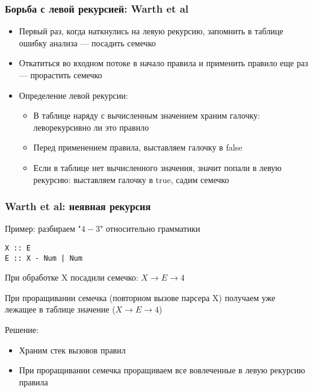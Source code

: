 \documentclass{beamer}
\begin{document}
\begin{frame}[fragile]
  \transwipe[direction=90]
  \frametitle{Борьба с левой рекурсией: Warth et al}
\begin{itemize}
  \item Первый раз, когда наткнулись на левую рекурсию, запомнить в таблице 
ошибку анализа --- посадить семечко
  \item Откатиться во входном потоке в начало правила и применить правило еще раз --- прорастить семечко
\end{itemize}

\begin{itemize}
  \item Определение левой рекурсии:
  \begin{itemize}
    \item В таблице наряду с вычисленным значением храним галочку: 
леворекурсивно ли это правило
    \item Перед применением правила, выставляем галочку в false
    \item Если в таблице нет вычисленного значения, значит попали в левую 
рекурсию: выставляем галочку в true, садим семечко
  \end{itemize}
\end{itemize}
\end{frame}

\begin{frame}[fragile]
  \transwipe[direction=90]
  \frametitle{Warth et al: неявная рекурсия}
Пример: разбираем "$4-3$" относительно грамматики
\begin{verbatim}
X :: E
E :: X - Num | Num
\end{verbatim}

При обработке X посадили семечко: $X \rightarrow E \rightarrow 4$

При проращивании семечка (повторном вызове парсера X) получаем уже лежащее в 
таблице значение ($X \rightarrow E \rightarrow 4$)
                        
Решение: 
\begin{itemize}
  \item Храним стек вызовов правил
  \item При проращивании семечка проращиваем все вовлеченные в левую рекурсию 
правила
\end{itemize}
\end{frame}
\end{document}

